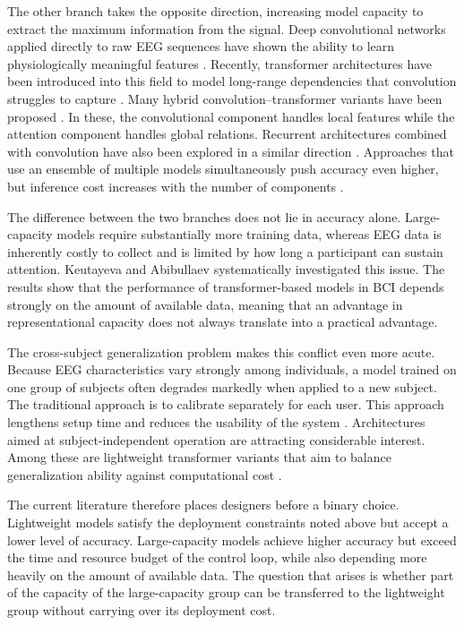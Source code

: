 The other branch takes the opposite direction, increasing model
capacity to extract the maximum information from the signal. Deep
convolutional networks applied directly to raw EEG sequences have
shown the ability to learn physiologically meaningful features
\cite{schirrmeister2017deep}. Recently, transformer architectures
have been introduced into this field to model long-range dependencies
that convolution struggles to capture \cite{vafaei2025transformers}.
Many hybrid convolution--transformer variants have been proposed
\cite{zhao2024ctnet, ding2025eegdeformer, altaheri2025temporal}. In
these, the convolutional component handles local features while the
attention component handles global relations. Recurrent architectures
combined with convolution have also been explored in a similar
direction \cite{wang20232d}. Approaches that use an ensemble of
multiple models simultaneously push accuracy even higher, but
inference cost increases with the number of components
\cite{zoumpourlis2024motor}.

The difference between the two branches does not lie in accuracy
alone. Large-capacity models require substantially more training
data, whereas EEG data is inherently costly to collect and is limited
by how long a participant can sustain attention. Keutayeva and
Abibullaev \cite{keutayeva2024data} systematically investigated this
issue. The results show that the performance of transformer-based
models in BCI depends strongly on the amount of available data,
meaning that an advantage in representational capacity does not
always translate into a practical advantage.

The cross-subject generalization problem makes this conflict even
more acute. Because EEG characteristics vary strongly among
individuals, a model trained on one group of subjects often degrades
markedly when applied to a new subject. The traditional approach is
to calibrate separately for each user. This approach lengthens setup
time and reduces the usability of the system \cite{wei2023intra}.
Architectures aimed at subject-independent operation are attracting
considerable interest. Among these are lightweight transformer
variants that aim to balance generalization ability against
computational cost \cite{keutayeva2024compact}.

The current literature therefore places designers before a binary
choice. Lightweight models satisfy the deployment constraints noted
above but accept a lower level of accuracy. Large-capacity models
achieve higher accuracy but exceed the time and resource budget of
the control loop, while also depending more heavily on the amount of
available data. The question that arises is whether part of the
capacity of the large-capacity group can be transferred to the
lightweight group without carrying over its deployment cost.

